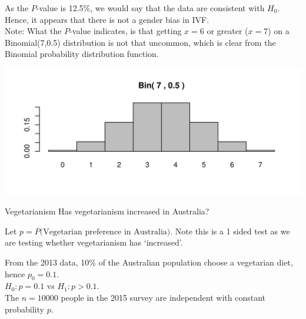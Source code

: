 \documentclass[t,xcolor=pdftex,dvipsnames,table]{beamer}\usepackage[]{graphicx}\usepackage[]{color}
\makeatletter
\def\maxwidth{ %
  \ifdim\Gin@nat@width>\linewidth
    \linewidth
  \else
    \Gin@nat@width
  \fi
}
\newenvironment{knitrout}{}{} %
\makeatother
\begin{document}
\begin{frame}[fragile]{}

As the $P$-value is 12.5\%, we would say that the data are consistent with $H_{0}$. Hence, it appears that there is not a gender bias in IVF.\\

\vspace{.5cm}
Note: What the $P$-value indicates, is that getting $x=6$ or greater ($x=7$) on a Binomial(7,0.5) distribution is not that uncommon, which is clear from the Binomial probability distribution function.

\begin{knitrout}
\color{fgcolor}
\includegraphics[width=\maxwidth]{figure/unnamed-chunk-126-1} 

\end{knitrout}
\end{frame}


\begin{frame}{}

\begin{block}{Vegetarianism}
Has vegetarianism increased in Australia?
\end{block}

\vspace{.5cm}
Let $p = P(\mbox{Vegetarian preference in Australia)}$. Note this is a 1 sided test as we are testing whether vegetarianism has `increased'.

\vspace{.5cm}
From the 2013 data, 10\% of the Australian population choose a vegetarian diet, hence $p_{0} = 0.1$. \\
$H_{0}: p = 0.1$ vs $H_{1}: p > 0.1$. \\

\vspace{.5cm}
 The $n=10000$ people in the 2015 survey are independent with constant probability $p$.
\end{frame}
\end{document}
